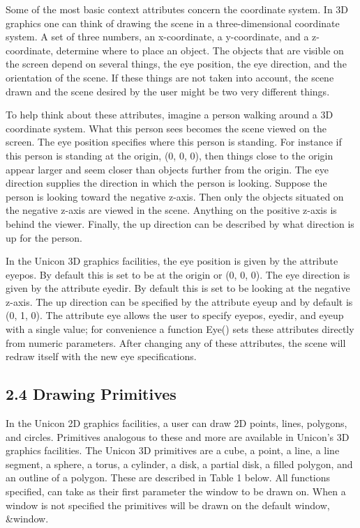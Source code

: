\documentclass[letterpaper]{article}
\begin{document}
Some of the most basic context attributes concern the coordinate
system. In 3D graphics one can think of drawing the scene in a
three-dimensional coordinate system. A set of three numbers, an
x-coordinate, a y-coordinate, and a z-coordinate, determine where to
place an object. The objects that are visible on the screen depend on
several things, the eye position, the eye direction, and the
orientation of the scene. If these things are not taken into account,
the scene drawn and the scene desired by the user might be two very
different things.

To help think about these attributes, imagine a person walking around
a 3D coordinate system. What this person sees becomes the scene viewed
on the screen. The eye position specifies where this person is
standing. For instance if this person is standing at the origin,
\textsf{(0, 0, 0)}, then things close to the origin appear larger and
seem closer than objects further from the origin. The eye direction
supplies the direction in which the person is looking. Suppose the
person is looking toward the negative z-axis. Then only the objects
situated on the negative z-axis are viewed in the scene. Anything on
the positive z-axis is behind the viewer. Finally, the up direction
can be described by what direction is up for the person.

In the Unicon 3D graphics facilities, the eye position is given by the
attribute \textsf{eyepos}. By default this is set to be at the origin
or \textsf{(0, 0, 0)}. The eye direction is given by the attribute
\textsf{eyedir}. By default this is set to be looking at the negative
z-axis. The up direction can be specified by the attribute
\textsf{eyeup} and by default is \textsf{(0, 1, 0)}. The attribute
\textsf{eye} allows the user to specify \textsf{eyepos},
\textsf{eyedir}, and \textsf{eyeup} with a single value; for
convenience a function \textsf{Eye()} sets these attributes directly
from numeric parameters. After changing any of these attributes, the
scene will redraw itself with the new eye specifications.


\bigskip

\subsection[2.4 Drawing Primitives]{2.4 Drawing Primitives}

In the Unicon 2D graphics facilities, a user can draw 2D points,
lines, polygons, and circles. Primitives analogous to these and more
are available in Unicon's 3D graphics facilities. The Unicon 3D
primitives are a cube, a point, a line, a line segment, a sphere, a
torus, a cylinder, a disk, a partial disk, a filled polygon, and an
outline of a polygon.  These are described in Table 1 below. All
functions specified, can take as their first parameter the window to
be drawn on. When a window is not specified the primitives will be
drawn on the default window, \textsf{\&window}.
\end{document}
